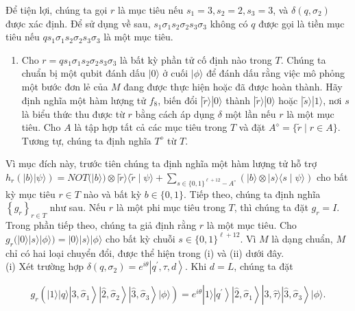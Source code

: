 \documentclass[10pt]{article}
\begin{document}
Để tiện lợi, chúng ta gọi $r$ là mục tiêu nếu $s_{1}=3, s_{2}=2, s_{3}=3$, và $\delta\left(q, \sigma_{2}\right)$ được xác định. Để sử dụng về sau, $s_{1} \sigma_{1} s_{2} \sigma_{2} s_{3} \sigma_{3}$ không có $q$ được gọi là tiền mục tiêu nếu $q s_{1} \sigma_{1} s_{2} \sigma_{2} s_{3} \sigma_{3}$ là một mục tiêu.

\begin{enumerate}
  \item Cho $r=q s_{1} \sigma_{1} s_{2} \sigma_{2} s_{3} \sigma_{3}$ là bất kỳ phần tử cố định nào trong $T$. Chúng ta chuẩn bị một qubit đánh dấu $|0\rangle$ ở cuối $|\phi\rangle$ để đánh dấu rằng việc mô phỏng một bước đơn lẻ của $M$ đang được thực hiện hoặc đã được hoàn thành. Hãy định nghĩa một hàm lượng tử $f_{8}$, biến đổi $|\tilde{r}\rangle|0\rangle$ thành $|\tilde{r}\rangle|0\rangle$ hoặc $|\tilde{s}\rangle|1\rangle$, nơi $s$ là biểu thức thu được từ $r$ bằng cách áp dụng $\delta$ một lần nếu $r$ là một mục tiêu. Cho $A$ là tập hợp tất cả các mục tiêu trong $T$ và đặt $A^{\diamond}=\{\tilde{r} \mid r \in A\}$. Tương tự, chúng ta định nghĩa $T^{\diamond}$ từ $T$.
\end{enumerate}

Vì mục đích này, trước tiên chúng ta định nghĩa một hàm lượng tử hỗ trợ $h_{r}(|b\rangle|\psi\rangle)=N O T(|b\rangle) \otimes|\tilde{r}\rangle\langle\tilde{r} \mid \psi\rangle+ \sum_{s \in\{0,1\}^{\ell+12}-A^{\circ}}(|b\rangle \otimes|s\rangle\langle s \mid \psi\rangle)$ cho bất kỳ mục tiêu $r \in T$ nào và bất kỳ $b \in\{0,1\}$. Tiếp theo, chúng ta định nghĩa $\left\{g_{r}\right\}_{r \in T}$ như sau. Nếu $r$ là một phi mục tiêu trong $T$, thì chúng ta đặt $g_{r}=I$. Trong phần tiếp theo, chúng ta giả định rằng $r$ là một mục tiêu. Cho $g_{r}(|0\rangle|s\rangle|\phi\rangle)=|0\rangle|s\rangle|\phi\rangle$ cho bất kỳ chuỗi $s \in\{0,1\}^{\ell+12}$. Vì $M$ là dạng chuẩn, $M$ chỉ có hai loại chuyển đổi, được thể hiện trong (i) và (ii) dưới đây.\\
(i) Xét trường hợp $\delta\left(q, \sigma_{2}\right)=e^{i \theta}\left|q^{\prime}, \tau, d\right\rangle$. Khi $d=L$, chúng ta đặt

$$
g_{r}\left(|1\rangle|q\rangle\left|\hat{3}, \hat{\sigma}_{1}\right\rangle\left|\hat{2}, \hat{\sigma}_{2}\right\rangle\left|\hat{3}, \hat{\sigma}_{3}\right\rangle|\phi\rangle\right)=e^{i \theta}|1\rangle\left|q^{\prime}\right\rangle\left|\hat{2}, \hat{\sigma}_{1}\right\rangle|\hat{3}, \hat{\tau}\rangle\left|\hat{3}, \hat{\sigma}_{3}\right\rangle|\phi\rangle .
$$
\end{document}
